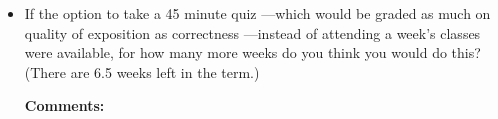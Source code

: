 \documentclass[handout]{mcs}
\begin{document}
\begin{itemize}
\begin{itemize}
\item If the option to take a 45 minute quiz ---which would be graded
  as much on quality of exposition as correctness ---instead of
  attending a week's classes were available, for how many more weeks
  do you think you would do this?  (There are 6.5 weeks left in the
  term.)\hfill\examrule[0.7in]



\textbf{Comments:}



\end{itemize}

\end{itemize}
\end{document}
